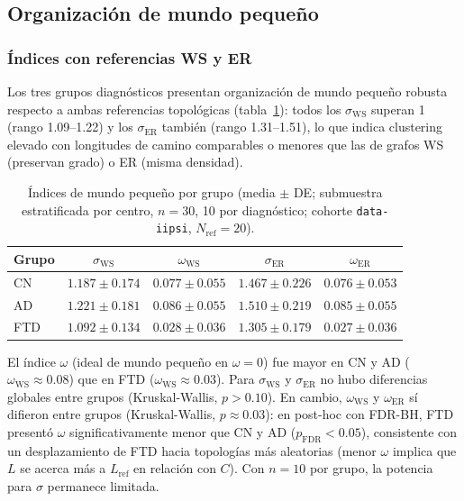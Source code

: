 \documentclass[12pt,a4paper]{article}
\begin{document}
\subsection{Organización de mundo pequeño}

\subsubsection{Índices con referencias WS y ER}

Los tres grupos diagnósticos presentan organización de mundo pequeño robusta respecto a
ambas referencias topológicas (tabla~\ref{tab:small_world}): todos los $\sigma_{\text{WS}}$
superan 1 (rango 1.09--1.22) y los $\sigma_{\text{ER}}$ también (rango 1.31--1.51), lo que
indica clustering elevado con longitudes de camino comparables o menores que las de grafos WS
(preservan grado) o ER (misma densidad).

\begin{table}[H]
  \centering
  \caption{Índices de mundo pequeño por grupo (media $\pm$ DE; submuestra estratificada por
  centro, $n = 30$, 10 por diagnóstico; cohorte \texttt{data-iipsi}, $N_{\text{ref}} = 20$).}
  \label{tab:small_world}
  \begin{tabular}{lcccc}
    \toprule
    Grupo & $\sigma_{\text{WS}}$ & $\omega_{\text{WS}}$ & $\sigma_{\text{ER}}$ & $\omega_{\text{ER}}$ \\
    \midrule
    CN & $1.187 \pm 0.174$ & $0.077 \pm 0.055$ & $1.467 \pm 0.226$ & $0.076 \pm 0.053$ \\
    AD & $1.221 \pm 0.181$ & $0.086 \pm 0.055$ & $1.510 \pm 0.219$ & $0.085 \pm 0.055$ \\
    FTD & $1.092 \pm 0.134$ & $0.028 \pm 0.036$ & $1.305 \pm 0.179$ & $0.027 \pm 0.036$ \\
    \bottomrule
  \end{tabular}
\end{table}

El índice $\omega$ (ideal de mundo pequeño en $\omega = 0$) fue mayor en CN y AD
($\omega_{\text{WS}} \approx 0.08$) que en FTD ($\omega_{\text{WS}} \approx 0.03$). Para
$\sigma_{\text{WS}}$ y $\sigma_{\text{ER}}$ no hubo diferencias globales entre grupos
(Kruskal-Wallis, $p > 0.10$). En cambio, $\omega_{\text{WS}}$ y $\omega_{\text{ER}}$ sí
difieron entre grupos (Kruskal-Wallis, $p \approx 0.03$): en post-hoc con FDR-BH, FTD presentó
$\omega$ significativamente menor que CN y AD ($p_{\text{FDR}} < 0.05$), consistente con un
desplazamiento de FTD hacia topologías más aleatorias (menor $\omega$ implica que $L$ se
acerca más a $L_{\text{ref}}$ en relación con $C$). Con $n = 10$ por grupo, la potencia para
$\sigma$ permanece limitada.
\end{document}
